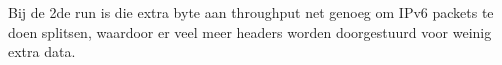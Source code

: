 Bij de 2de run is die extra byte aan throughput net genoeg om IPv6 packets te doen splitsen, waardoor er veel meer headers worden doorgestuurd voor weinig extra data.